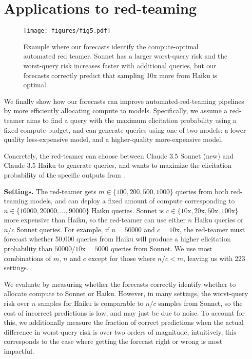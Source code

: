 \section{Applications to red-teaming}
\label{sec:applications}

\begin{figure}[t]
    \centering
    \texttt{[image: figures/fig5.pdf]}
    \vspace{-1mm}
    \caption{Example where our forecasts identify the compute-optimal automated red teamer. Sonnet has a larger worst-query risk and the worst-query risk increases faster with additional queries, but our forecasts correctly predict that sampling 10x more from Haiku is optimal.}
    \vspace{-2mm}
    \label{fig:red-teaming-models}
\end{figure}

We finally show how our forecasts can improve automated-red-teaming pipelines by more efficiently allocating compute to models. Specifically, we assume a red-teamer aims to find a query with the maximum elicitation probability using a fixed compute budget, and can generate queries using one of two models: a lower-quality less-expensive model, and a higher-quality more-expensive model. 

Concretely, the red-teamer can choose between Claude 3.5 Sonnet (new) and Claude 3.5 Haiku to generate queries, and wants to maximize the elicitation probability of the specific outputs from .

\textbf{Settings.} The red-teamer gets $m \in \{100, 200, 500, 1000\}$ queries from both red-teaming models, and can deploy a fixed amount of compute corresponding to $n \in \{10000, 20000, \hdots, 90000\}$ Haiku queries. Sonnet is $c \in \{\text{10x}, \text{20x}, \text{50x}, \text{100x}\}$ more expensive than Haiku, so the red-teamer can use either $n$ Haiku queries or $n/c$ Sonnet queries. For example, if $n = 50000$ and $c=\text{10x}$, the red-teamer must forecast whether 50,000 queries from Haiku will produce a higher elicitation probability than $50000 / \text{10x} = 5000$ queries from Sonnet. We use most combinations of $m$, $n$ and $c$ except for those where $n/c < m$, leaving us with 223 settings.  

We evaluate by measuring whether the forecasts correctly identify whether to allocate compute to Sonnet or Haiku. However, in many settings, the worst-query risk over $n$ samples for Haiku is comparable to $n/c$ samples from Sonnet, so the cost of incorrect predictions is low, and may just be due to noise. To account for this, we additionally measure the fraction of correct predictions when the actual difference in worst-query risk is over two orders of magnitude; intuitively, this corresponds to the case where getting the forecast right or wrong is most impactful. 

